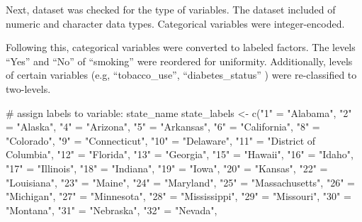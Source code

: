 \documentclass[
  letterpaper,
  DIV=11,
  numbers=noendperiod]{scrartcl}
\newenvironment{Shaded}{\begin{snugshade}}{\end{snugshade}}
\newcommand{\CommentTok}[1]{\textcolor[rgb]{0.37,0.37,0.37}{#1}}
\newcommand{\FunctionTok}[1]{\textcolor[rgb]{0.28,0.35,0.67}{#1}}
\newcommand{\NormalTok}[1]{\textcolor[rgb]{0.00,0.23,0.31}{#1}}
\newcommand{\OtherTok}[1]{\textcolor[rgb]{0.00,0.23,0.31}{#1}}
\newcommand{\StringTok}[1]{\textcolor[rgb]{0.13,0.47,0.30}{#1}}
\begin{document}
Next, dataset was checked for the type of variables. The dataset
included of numeric and character data types. Categorical variables were
integer-encoded.

Following this, categorical variables were converted to labeled factors.
The levels ``Yes'' and ``No'' of ``smoking'' were reordered for
uniformity. Additionally, levels of certain variables (e.g,
``tobacco\_use'', ``diabetes\_status'' ) were re-classified to
two-levels.

\begin{Shaded}
\begin{Highlighting}[]
\CommentTok{\# assign labels to variable: state\_name}
\NormalTok{state\_labels }\OtherTok{\textless{}{-}} \FunctionTok{c}\NormalTok{(}\StringTok{"1"} \OtherTok{=} \StringTok{"Alabama"}\NormalTok{, }\StringTok{"2"} \OtherTok{=} \StringTok{"Alaska"}\NormalTok{, }\StringTok{"4"} \OtherTok{=} \StringTok{"Arizona"}\NormalTok{, }
                  \StringTok{"5"} \OtherTok{=} \StringTok{"Arkansas"}\NormalTok{, }\StringTok{"6"} \OtherTok{=} \StringTok{"California"}\NormalTok{, }\StringTok{"8"} \OtherTok{=} \StringTok{"Colorado"}\NormalTok{, }
                  \StringTok{"9"} \OtherTok{=} \StringTok{"Connecticut"}\NormalTok{, }\StringTok{"10"} \OtherTok{=} \StringTok{"Delaware"}\NormalTok{, }
                  \StringTok{"11"} \OtherTok{=} \StringTok{"District of Columbia"}\NormalTok{, }\StringTok{"12"} \OtherTok{=} \StringTok{"Florida"}\NormalTok{, }
                  \StringTok{"13"} \OtherTok{=} \StringTok{"Georgia"}\NormalTok{, }\StringTok{"15"} \OtherTok{=} \StringTok{"Hawaii"}\NormalTok{, }\StringTok{"16"} \OtherTok{=} \StringTok{"Idaho"}\NormalTok{, }
                  \StringTok{"17"} \OtherTok{=} \StringTok{"Illinois"}\NormalTok{, }\StringTok{"18"} \OtherTok{=} \StringTok{"Indiana"}\NormalTok{, }\StringTok{"19"} \OtherTok{=} \StringTok{"Iowa"}\NormalTok{, }
                  \StringTok{"20"} \OtherTok{=} \StringTok{"Kansas"}\NormalTok{, }\StringTok{"22"} \OtherTok{=} \StringTok{"Louisiana"}\NormalTok{, }\StringTok{"23"} \OtherTok{=} \StringTok{"Maine"}\NormalTok{, }
                  \StringTok{"24"} \OtherTok{=} \StringTok{"Maryland"}\NormalTok{, }\StringTok{"25"} \OtherTok{=} \StringTok{"Massachusetts"}\NormalTok{, }\StringTok{"26"} \OtherTok{=} \StringTok{"Michigan"}\NormalTok{,}
                  \StringTok{"27"} \OtherTok{=} \StringTok{"Minnesota"}\NormalTok{, }\StringTok{"28"} \OtherTok{=} \StringTok{"Mississippi"}\NormalTok{, }\StringTok{"29"} \OtherTok{=} \StringTok{"Missouri"}\NormalTok{, }
                  \StringTok{"30"} \OtherTok{=} \StringTok{"Montana"}\NormalTok{, }\StringTok{"31"} \OtherTok{=} \StringTok{"Nebraska"}\NormalTok{, }\StringTok{"32"} \OtherTok{=} \StringTok{"Nevada"}\NormalTok{, }

\end{Highlighting}
\end{Shaded}
\end{document}

